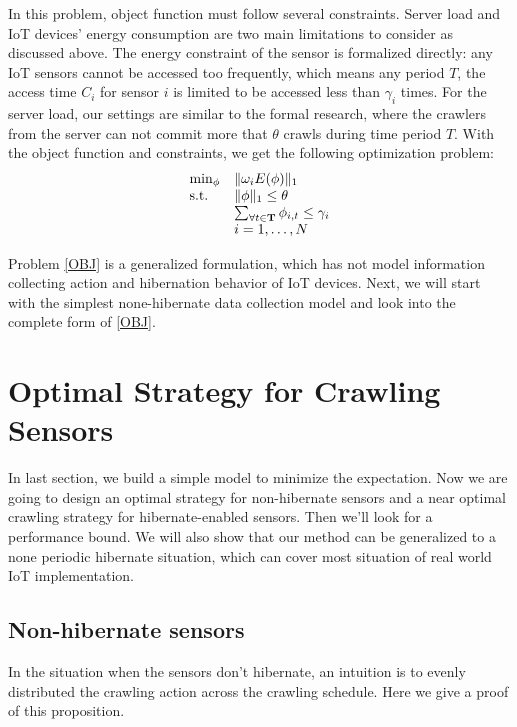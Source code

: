 \documentclass[conference]{IEEEtran}
\begin{document}
In this problem, object function must follow several constraints. Server load and IoT devices' energy consumption are two main limitations to consider as discussed above. 
The energy constraint of the sensor is formalized directly: any IoT sensors cannot be accessed too frequently, which means any period $T$, the access time $C_i$ for sensor $i$ is limited to be accessed less than $\gamma_i$ times. For the server load, our settings are similar to the formal research\cite{Wolf2002}, where the crawlers from the server can not commit more that $\theta$ crawls during time period $T$.
With the object function and constraints, we get the following optimization problem:
\begin{eqnarray}
\begin{array}{ll}
\min_{\phi}&\Arrowvert \omega_i E(\phi) \Arrowvert_{1}\\
\text{s.t.} 
&\Arrowvert \phi \Arrowvert_{1}\leq\theta\\
&\sum_{\forall t \in \mathbf{T}}{\phi_{i,t}}\leq\gamma_i\\
&i=1,\ldots,N
\end{array}\label{OBJ}
\end{eqnarray}


Problem \eqref{OBJ} is a generalized formulation, which has not model information collecting action and hibernation behavior of IoT devices. Next, we will start with the simplest none-hibernate data collection model and look into the complete form of \eqref{OBJ}.

\section{Optimal Strategy for Crawling Sensors}

In last section, we build a simple model to minimize the expectation. Now we are going to design an optimal strategy for non-hibernate sensors and a near optimal crawling strategy for hibernate-enabled sensors. Then we'll look for a performance bound. We will also show that our method can be generalized to a none periodic hibernate situation, which can cover most situation of real world IoT implementation. 

\subsection{Non-hibernate sensors}

In the situation when the sensors don't hibernate, an intuition is to evenly distributed the crawling action across the crawling schedule. Here we give a proof of this proposition.
\end{document}
